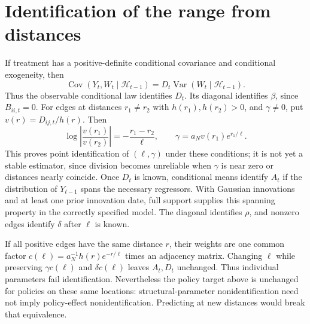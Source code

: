 \documentclass[11pt]{article}
\begin{document}
\section{Identification of the range from distances}
If treatment has a positive-definite conditional covariance and conditional exogeneity, then
\[
 \operatorname{Cov}(Y_t,W_t\mid\mathcal H_{t-1})
   =D_t\operatorname{Var}(W_t\mid\mathcal H_{t-1}).
\]
Thus the observable conditional law identifies $D_t$. Its diagonal identifies $\beta$, since $B_{ii,t}=0$. For edges at distances $r_1\neq r_2$ with $h(r_1),h(r_2)>0$, and $\gamma\neq0$, put $v(r)=D_{ij,t}/h(r)$. Then
\[
 \log\left|\frac{v(r_1)}{v(r_2)}\right|
       =-\frac{r_1-r_2}{\ell},\qquad
 \gamma=a_Nv(r_1)e^{r_1/\ell}.
\]
This proves point identification of $(\ell,\gamma)$ under these conditions; it is not yet a stable estimator, since division becomes unreliable when $\gamma$ is near zero or distances nearly coincide. Once $D_t$ is known, conditional means identify $A_t$ if the distribution of $Y_{t-1}$ spans the necessary regressors. With Gaussian innovations and at least one prior innovation date, full support supplies this spanning property in the correctly specified model. The diagonal identifies $\rho$, and nonzero edges identify $\delta$ after $\ell$ is known.

If all positive edges have the same distance $r$, their weights are one common factor $c(\ell)=a_N^{-1}h(r)e^{-r/\ell}$ times an adjacency matrix. Changing $\ell$ while preserving $\gamma c(\ell)$ and $\delta c(\ell)$ leaves $A_t,D_t$ unchanged. Thus individual parameters fail identification. Nevertheless the policy target above is unchanged for policies on these same locations: structural-parameter nonidentification need not imply policy-effect nonidentification. Predicting at new distances would break that equivalence.
\end{document}
